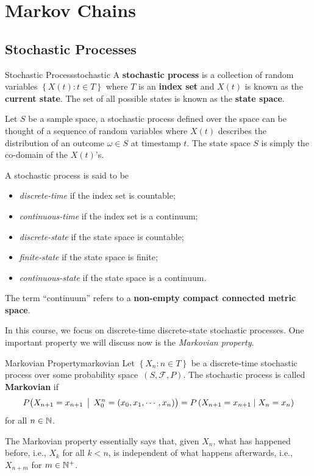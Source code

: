 \documentclass[math, code]{amznotes}
\theoremstyle{remark}
\begin{document}
\chapter{Markov Chains}
\section{Stochastic Processes}
\begin{dfnbox}{Stochastic Process}{stochastic}
    A {\color{red} \textbf{stochastic process}} is a collection of random variables $\left\{X\left(t\right) \colon t \in T\right\}$ where $T$ is an {\color{red} \textbf{index set}} and $X\left(t\right)$ is known as the {\color{red} \textbf{current state}}. The set of all possible states is known as the {\color{red} \textbf{state space}}.
\end{dfnbox}
Let $S$ be a sample space, a stochastic process defined over the space can be thought of a sequence of random variables where $X\left(t\right)$ describes the distribution of an outcome $\omega \in S$ at timestamp $t$. The state space $S$ is simply the co-domain of the $X\left(t\right)$'s.

A stochastic process is said to be 
\begin{itemize}
    \item \textit{discrete-time} if the index set is countable;
    \item \textit{continuous-time} if the index set is a continuum;
    \item \textit{discrete-state} if the state space is countable;
    \item \textit{finite-state} if the state space is finite;
    \item \textit{continuous-state} if the state space is a continuum.
\end{itemize}
The term ``continuum'' refers to a \textbf{non-empty compact connected metric space}. 

In this course, we focus on discrete-time discrete-state stochastic processes. One important property we will discuss now is the \textit{Markovian property}.
\begin{dfnbox}{Markovian Property}{markovian}
    Let $\left\{X_n \colon n \in T\right\}$ be a discrete-time stochastic process over some probability space~$\left(S, \mathcal{F}, P\right)$. The stochastic process is called {\color{red} \textbf{Markovian}} if 
    \begin{equation*}
        P\bigl(X_{n + 1} = x_{n + 1} \,\bigm\vert\, X_0^n = \left(x_0, x_1, \cdots, x_n\right)\bigr) = P\left(X_{n + 1} = x_{n + 1} \mid X_n = x_n\right)
    \end{equation*}
    for all $n \in \mathbb{N}$.
\end{dfnbox}
The Markovian property essentially says that, given $X_n$, what has happened before, i.e., $X_k$ for all $k < n$, is independent of what happens afterwards, i.e., $X_{n + m}$ for $m \in \mathbb{N}^+$.
\end{document}
